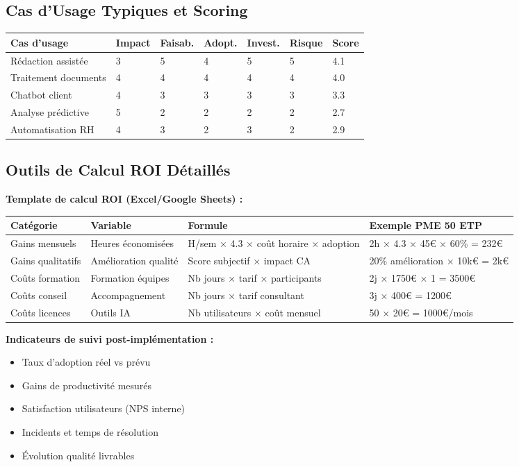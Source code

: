 \subsection{Cas d'Usage Typiques et Scoring}

\begin{longtable}{@{}p{4cm}p{1.5cm}p{1.5cm}p{1.5cm}p{1.5cm}p{1.5cm}p{1.5cm}@{}}
\toprule
\textbf{Cas d'usage} & \textbf{Impact} & \textbf{Faisab.} & \textbf{Adopt.} & \textbf{Invest.} & \textbf{Risque} & \textbf{Score} \\
\midrule
Rédaction assistée & 3 & 5 & 4 & 5 & 5 & 4.1 \\
Traitement documents & 4 & 4 & 4 & 4 & 4 & 4.0 \\
Chatbot client & 4 & 3 & 3 & 3 & 3 & 3.3 \\
Analyse prédictive & 5 & 2 & 2 & 2 & 2 & 2.7 \\
Automatisation RH & 4 & 3 & 2 & 3 & 2 & 2.9 \\
\bottomrule
\end{longtable}

\subsection{Outils de Calcul ROI Détaillés}

\textbf{Template de calcul ROI (Excel/Google Sheets) :}

\begin{longtable}{@{}p{4cm}p{3cm}p{3cm}p{4cm}@{}}
\toprule
\textbf{Catégorie} & \textbf{Variable} & \textbf{Formule} & \textbf{Exemple PME 50 ETP} \\
\midrule
Gains mensuels & Heures économisées & H/sem × 4.3 × coût horaire × adoption & 2h × 4.3 × 45€ × 60\% = 232€ \\
Gains qualitatifs & Amélioration qualité & Score subjectif × impact CA & 20\% amélioration × 10k€ = 2k€ \\
Coûts formation & Formation équipes & Nb jours × tarif × participants & 2j × 1750€ × 1 = 3500€ \\
Coûts conseil & Accompagnement & Nb jours × tarif consultant & 3j × 400€ = 1200€ \\
Coûts licences & Outils IA & Nb utilisateurs × coût mensuel & 50 × 20€ = 1000€/mois \\
\bottomrule
\end{longtable}

\textbf{Indicateurs de suivi post-implémentation :}
\begin{itemize}
    \item Taux d'adoption réel vs prévu
    \item Gains de productivité mesurés
    \item Satisfaction utilisateurs (NPS interne)
    \item Incidents et temps de résolution
    \item Évolution qualité livrables
\end{itemize}

